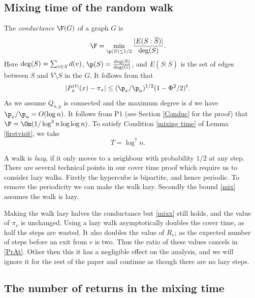 \documentclass[12pt]{article}
\def\red{\color{red}}
\def\deg{\text{deg}}
\newcommand{\ol}[1]{\overline{#1}}
\def\sm{\setminus}
\def\deg{{\rm deg}}
\begin{document}
\subsection{Mixing time of the random walk}\label{Tmix}
The {\em conductance}
$\F(G)$ of a graph $G$ is
\[
\F=\min_{\p(S)\leq 1/2}\frac{|E(S:\ol{S})|}{\deg(S)}.
\]
Here $\deg(S)=\sum_{v\in S}d(v)$, $\p(S)=\frac{\deg(S)}{\deg(G)}$,
and $E(S:\ol{S})$ is the set of edges between $S$ and $V \sm S$ in the
$G$. It follows
from  \cite{JS} that
\begin{equation}\label{mix}
|P_{u}^{(t)}(x)-\pi_x| \leq (\p_x/\p_u)^{1/2}(1-\Phi^2/2)^t.
\end{equation}
As we assume $Q_{n,p}$ is connected and the maximum degree is $d$ we have $\p_x/\p_u=O(\log n)$.
It follows from P1 (see Section  \ref{Conduc} for the proof)  that  $\F=\Om(1/\log^3 n \log \log n)$.
To  satisfy Condition \eqref{mixing time} of Lemma \ref{firstvisit}, we  take
\begin{equation}\label{mixx}
T=\log^7 n.
\end{equation}



A walk is {\em lazy}, if it only
moves to a neighbour with probability $1/2$ at any step.
There are several technical points in our cover time proof which require us to consider lazy walks.
Firstly the hypercube is bipartite, and hence periodic.
To remove the periodicity we
can make the walk lazy.
Secondly the bound \eqref{mix}
assumes  the walk is lazy.

Making the walk lazy halves the conductance but \eqref{mixx} still holds, and the value of $\pi_v$
is unchanged.
Using a lazy walk asymptotically doubles the cover time, as half the steps are wasted.
It also  doubles the value of $R_v$; as the expected number of steps before an exit from $v$ is two.
Thus the ratio of these values cancels in \eqref{PrAt}.
Other then this it has a negligible effect on the
analysis, and we will ignore it for the rest of the paper and continue
as though there are no lazy steps.




\subsection{The number of returns in the mixing time}\label{Rv=1}
\end{document}
